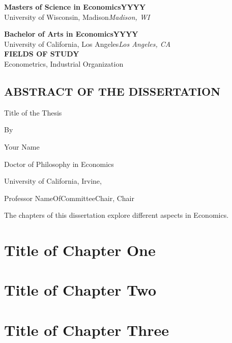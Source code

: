 \documentclass[letterpaper]{report}
\begin{document}
\textbf{Masters of Science in Economics\hfill YYYY}\\[-0.1cm]
University of Wisconsin, Madison\hfill \textit{Madison, WI}

\textbf{Bachelor of Arts in Economics\hfill YYYY}\\[-0.1cm]
University of California, Los Angeles\hfill \textit{Los Angeles, CA}\\

\textbf{FIELDS OF STUDY}\\
Econometrics, Industrial Organization

\newpage
\doublespacing
\begin{center}
  \section*{ABSTRACT OF THE DISSERTATION}
  
  Title of the Thesis
  
  By
  
  Your Name
  
  Doctor of Philosophy in Economics
  
  University of California, Irvine, \the\year{}
  
  Professor NameOfCommitteeChair, Chair
\end{center}
\vspace*{0.5cm}

The chapters of this dissertation explore different aspects in Economics. \lipsum[87-88]

\newpage
\doublespacing
\pagestyle{text}
\setcounter{page}{1}

\chapter{Title of Chapter One}


\chapter{Title of Chapter Two}


\chapter{Title of Chapter Three}

\end{document}
